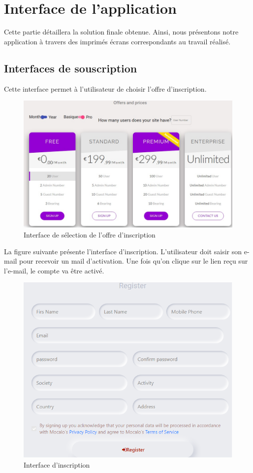 \section{	Interface de l'application}
\hspace{4mm}Cette partie détaillera la solution finale obtenue. Ainsi, nous présentons notre application à travers des imprimés écrans correspondants au travail réalisé.
\subsection{	Interfaces de souscription}
\hspace{4mm}Cette interface permet à l’utilisateur de choisir l’offre d’inscription.
\begin{figure}[h]
    \centering
    \includegraphics{figures/33anis15.png}
    \caption{Interface de sélection de l’offre d’inscription}
    \label{fig:interface_offre}
\end{figure}
\par La figure suivante présente l’interface d’inscription. L’utilisateur doit saisir son e-mail pour recevoir un mail d’activation. Une fois qu’on clique sur le lien reçu sur l’e-mail, le compte va être activé.\newpage
\begin{figure}[h]
    \centering
    \includegraphics{figures/33anis16.png}
    \caption{Interface d’inscription}
    \label{fig:interface_inscri}
\end{figure}

